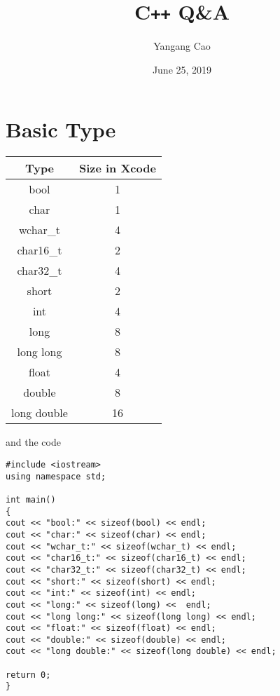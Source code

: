 \documentclass[10pt,a4paper,oneside]{article}
\date{June 25, 2019}
\author{Yangang Cao}
\title{C{}\texttt{++} Q\&A}
\begin{document}
\maketitle
\tableofcontents

\newpage
\section{Basic Type}
\begin{center}
\begin{tabular}{cc}
	\hline
	Type& Size in Xcode\\
	\hline
	bool& 1\\
	char& 1\\
	wchar\_t&4\\
	char16\_t&2\\
	char32\_t&4\\
	short&2\\
	int&4\\
	long&8\\
	long long&8\\
	float&4\\
	double&8\\
	long double&16\\
	\hline
\end{tabular}
\end{center}
and the code
\begin{lstlisting}
#include <iostream>
using namespace std;

int main()
{
cout << "bool:" << sizeof(bool) << endl;
cout << "char:" << sizeof(char) << endl;
cout << "wchar_t:" << sizeof(wchar_t) << endl;
cout << "char16_t:" << sizeof(char16_t) << endl;
cout << "char32_t:" << sizeof(char32_t) << endl;
cout << "short:" << sizeof(short) << endl;
cout << "int:" << sizeof(int) << endl;
cout << "long:" << sizeof(long) <<  endl;
cout << "long long:" << sizeof(long long) << endl;
cout << "float:" << sizeof(float) << endl;
cout << "double:" << sizeof(double) << endl;
cout << "long double:" << sizeof(long double) << endl;

return 0;
}
\end{lstlisting}
\end{document}
